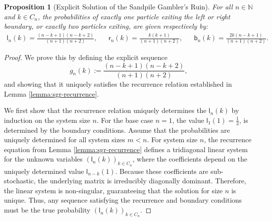 \documentclass[11pt]{article}
\newtheorem{proposition}{Proposition}[section]
\newcommand{\N}{\mathbb{N}}
\newcommand{\sgrleft}[2]{\mathsf{l}_{#1}(#2)}
\newcommand{\sgrright}[2]{\mathsf{r}_{#1}(#2)}
\newcommand{\sgrboth}[2]{\mathsf{b}_{#1}(#2)}
\begin{document}
\begin{proposition}[Explicit Solution of the Sandpile Gambler's Ruin]\label{prop:sgr}
    For all $n \in \N$ and $k \in C_n$, the probabilities of exactly one particle exiting the left or right boundary, or exactly two particles exiting, are given respectively by:
    \begin{align*}
        \sgrleft{n}{k} = \frac{(n-k+1)(n-k+2)}{(n+1)(n+2)}, &&
        \sgrright{n}{k} = \frac{k(k+1)}{(n+1)(n+2)}, &&
        \sgrboth{n}{k} = \frac{2k(n-k+1)}{(n+1)(n+2)}.
    \end{align*}
\end{proposition}
\begin{proof}
    We prove this by defining the explicit sequence $$g_n(k) := \frac{(n-k+1)(n-k+2)}{(n+1)(n+2)},$$ and showing that it uniquely satisfies the recurrence relation established in Lemma \ref{lemma:sgr-recurrence}.

    We first show that the recurrence relation uniquely determines the $\sgrleft{n}{k}$ by induction on the system size $n$. For the base case $n=1$, the value $\sgrleft{1}{1} = \frac{1}{3}$, is determined by the boundary conditions. Assume that the probabilities are uniquely determined for all system sizes $m < n$. For system size $n$, the recurrence equation from Lemma \ref{lemma:sgr-recurrence} defines a tridiagonal linear system for the unknown variables $(\sgrleft{n}{k})_{k\in C_n}$, where the coefficients depend on the uniquely determined value $\sgrleft{n-k}{1}$. Because these coefficients are sub-stochastic, the underlying matrix is irreducibly diagonally dominant. Therefore, the linear system is non-singular, guaranteeing that the solution for size $n$ is unique. Thus, any sequence satisfying the recurrence and boundary conditions must be the true probability $(\sgrleft{n}{k})_{k\in C_n}$.


\end{proof}
\end{document}
